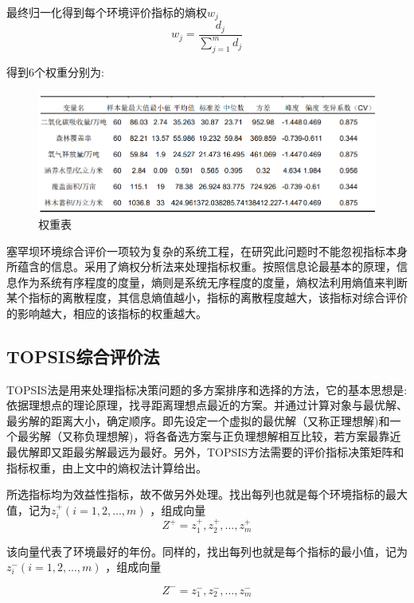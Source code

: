 \documentclass[UTF8]{ctexart}
\begin{document}
最终归一化得到每个环境评价指标的熵权$w_j$
\begin{equation}
    w_j=\frac{d_j}{\sum_{j=1}^{m}d_j}
\end{equation}

得到6个权重分别为:

\begin{figure}[H] %
    \centering %
    \includegraphics[width=1\textwidth]{./picture/biaoge1.png} %
    \caption{权重表} 
\end{figure}



塞罕坝环境综合评价一项较为复杂的系统工程，在研究此问题时不能忽视指标本身所蕴含的信息。采用了熵权分析法来处理指标权重。按照信息论最基本的原理，信息作为系统有序程度的度量，熵则是系统无序程度的度量，熵权法利用熵值来判断某个指标的离散程度，其信息熵值越小，指标的离散程度越大，该指标对综合评价的影响越大，相应的该指标的权重越大。 
\subsection{TOPSIS综合评价法}
TOPSIS法是用来处理指标决策问题的多方案排序和选择的方法，它的基本思想是:依据理想点的理论原理，找寻距离理想点最近的方案。并通过计算对象与最优解、最劣解的距离大小，确定顺序。即先设定一个虚拟的最优解（又称正理想解)和一个最劣解（又称负理想解)，将各备选方案与正负理想解相互比较，若方案最靠近最优解即又距最劣解最远为最好。另外，TOPSIS方法需要的评价指标决策矩阵和指标权重，由上文中的熵权法计算给出。

所选指标均为效益性指标，故不做另外处理。找出每列也就是每个环境指标的最大值，记为$z_i^+(i=1,2,...,m)$ ，组成向量
\begin{equation}
    Z^+={z_1^+,z_2^+,...,z_m^+}
\end{equation}

该向量代表了环境最好的年份。同样的，找出每列也就是每个指标的最小值，记为$z_i^-(i=1,2,...,m)$ ，组成向量

\begin{equation}
    Z^-={z_1^-,z_2^-,...,z_m^-}
\end{equation}
\end{document}

